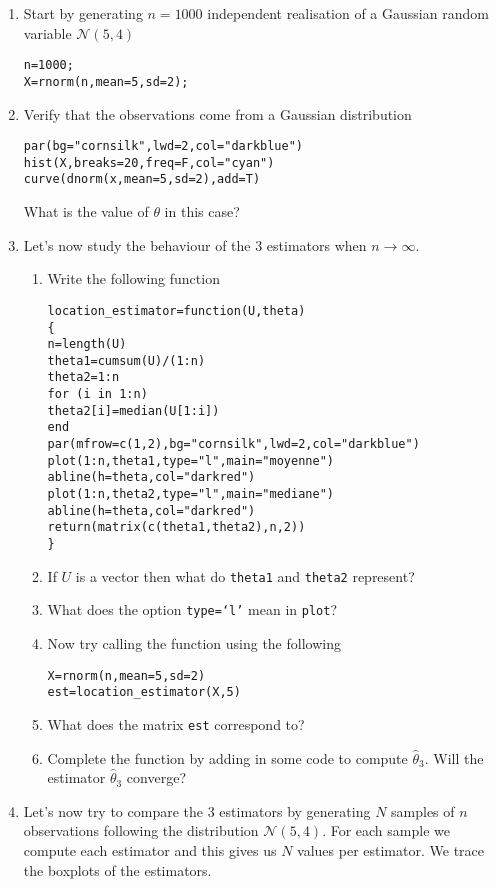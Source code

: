 \documentclass[a4paper,10pt]{article}
\begin{document}
\begin{enumerate} 
 \item Start by generating $n=1000$ independent realisation of a Gaussian random variable $\mathcal{N}(5,4)$
\begin{lstlisting}
n=1000;
X=rnorm(n,mean=5,sd=2);
\end{lstlisting} 

\item Verify that the observations come from a Gaussian distribution 
\begin{lstlisting}
par(bg="cornsilk",lwd=2,col="darkblue")
hist(X,breaks=20,freq=F,col="cyan")
curve(dnorm(x,mean=5,sd=2),add=T)
\end{lstlisting}
What is the value of $\theta$ in this case? 

\item Let's now study the behaviour of the 3 estimators when $n \rightarrow \infty$. 

\begin{enumerate}
\item Write the following function 
\begin{lstlisting}
location_estimator=function(U,theta)
{
n=length(U)
theta1=cumsum(U)/(1:n)
theta2=1:n
for (i in 1:n)
theta2[i]=median(U[1:i])
end
par(mfrow=c(1,2),bg="cornsilk",lwd=2,col="darkblue")
plot(1:n,theta1,type="l",main="moyenne")
abline(h=theta,col="darkred")
plot(1:n,theta2,type="l",main="mediane")
abline(h=theta,col="darkred")
return(matrix(c(theta1,theta2),n,2))
}
\end{lstlisting}
\item If $U$ is a vector then what do \texttt{theta1} and \texttt{theta2} represent? 
\item What does the option \texttt{type=`l'} mean in \texttt{plot}? 

\item Now try calling the function using the following 
\begin{lstlisting}
X=rnorm(n,mean=5,sd=2)
est=location_estimator(X,5)
\end{lstlisting}
\item What does the matrix \texttt{est} correspond to? 

\item Complete the function by adding in some code to compute $\hat{\theta}_3$. Will the estimator $\hat{\theta}_3$ converge? 
\end{enumerate}

\item Let's now try to compare the 3 estimators by generating $N$ samples of $n$ observations following the distribution $\mathcal{N}(5,4)$. For each sample we compute each estimator and this gives us $N$ values per estimator. We trace the boxplots of the estimators.  


\end{enumerate}
\end{document}

